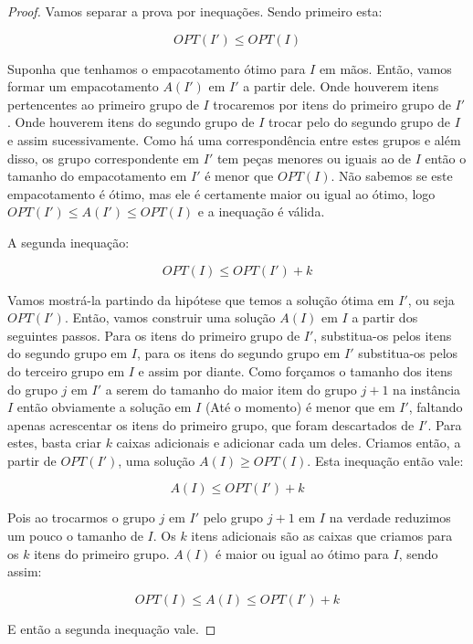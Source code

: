 \begin{proof}

Vamos separar a prova por inequações. Sendo primeiro esta:

\begin{equation}
OPT(I') \leq OPT(I) 
\end{equation}

Suponha que tenhamos o empacotamento ótimo para $I$ em mãos. Então, vamos formar um empacotamento $A(I')$ em $I'$ a partir dele. Onde houverem itens pertencentes ao primeiro grupo de $I$ trocaremos por itens do primeiro grupo de $I'$. Onde houverem itens do segundo grupo de $I$ trocar pelo do segundo grupo de $I$ e assim sucessivamente. Como há uma correspondência entre estes grupos e além disso, os grupo correspondente em $I'$ tem peças menores ou iguais ao de $I$ então o tamanho do empacotamento em $I'$ é menor que $OPT(I)$. Não sabemos se este empacotamento é ótimo, mas ele é certamente maior ou igual ao ótimo, logo $OPT(I') \leq A(I') \leq OPT(I)$ e a inequação é válida.

A segunda inequação:

\begin{equation}
OPT(I) \leq OPT(I')+k
\end{equation}

Vamos mostrá-la partindo da hipótese que temos a solução ótima em $I'$, ou seja $OPT(I')$. Então, vamos construir uma solução $A(I)$ em $I$ a partir dos seguintes passos. Para os itens do primeiro grupo de $I'$, substitua-os pelos itens do segundo grupo em $I$, para os itens do segundo grupo em $I'$ substitua-os pelos do terceiro grupo em $I$ e assim por diante. Como forçamos o tamanho dos itens do grupo $j$ em $I'$ a serem do tamanho do maior item do grupo $j+1$ na instância $I$ então obviamente a solução em $I$ (Até o momento) é menor que em $I'$, faltando apenas acrescentar os itens do primeiro grupo, que foram descartados de $I'$. Para estes, basta criar $k$ caixas adicionais e adicionar cada um deles. Criamos então, a partir de $OPT(I')$, uma solução $A(I) \geq OPT(I)$. Esta inequação então vale:

\begin{equation}
A(I) \leq OPT(I') + k
\end{equation}

Pois ao trocarmos o grupo $j$ em $I'$ pelo grupo $j+1$ em $I$ na verdade reduzimos um pouco o tamanho de $I$. Os $k$ itens adicionais são as caixas que criamos para os $k$ itens do primeiro grupo. $A(I)$ é maior ou igual ao ótimo para $I$, sendo assim:

\begin{equation}
OPT(I) \leq A(I) \leq OPT(I') + k
\end{equation}

E então a segunda inequação vale.

\end{proof}

